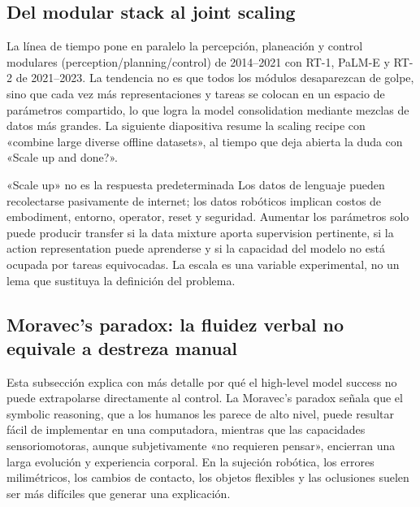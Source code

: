 \subsection{Del modular stack al joint scaling}

La línea de tiempo pone en paralelo la percepción, planeación y control modulares (perception/planning/control) de 2014--2021 con RT-1, PaLM-E y RT-2 de 2021--2023. La tendencia no es que todos los módulos desaparezcan de golpe, sino que cada vez más representaciones y tareas se colocan en un espacio de parámetros compartido, lo que logra la model consolidation mediante mezclas de datos más grandes. La siguiente diapositiva resume la scaling recipe con «combine large diverse offline datasets», al tiempo que deja abierta la duda con «Scale up and done?».



\begin{warningbox}{«Scale up» no es la respuesta predeterminada}
Los datos de lenguaje pueden recolectarse pasivamente de internet; los datos robóticos implican costos de embodiment, entorno, operator, reset y seguridad. Aumentar los parámetros solo puede producir transfer si la data mixture aporta supervision pertinente, si la action representation puede aprenderse y si la capacidad del modelo no está ocupada por tareas equivocadas. La escala es una variable experimental, no un lema que sustituya la definición del problema.
\end{warningbox}

\subsection{Moravec's paradox: la fluidez verbal no equivale a destreza manual}

Esta subsección explica con más detalle por qué el high-level model success no puede extrapolarse directamente al control. La Moravec's paradox señala que el symbolic reasoning, que a los humanos les parece de alto nivel, puede resultar fácil de implementar en una computadora, mientras que las capacidades sensoriomotoras, aunque subjetivamente «no requieren pensar», encierran una larga evolución y experiencia corporal. En la sujeción robótica, los errores milimétricos, los cambios de contacto, los objetos flexibles y las oclusiones suelen ser más difíciles que generar una explicación.

